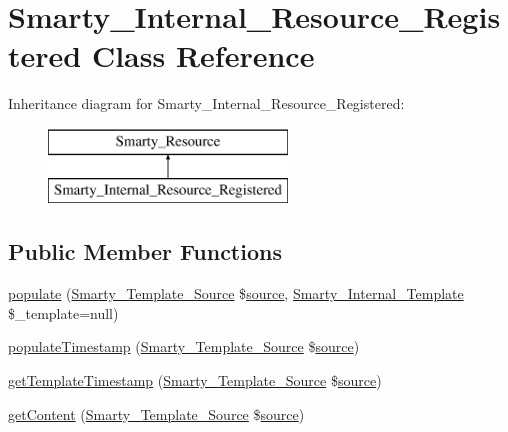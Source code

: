 \hypertarget{class_smarty___internal___resource___registered}{}\section{Smarty\+\_\+\+Internal\+\_\+\+Resource\+\_\+\+Registered Class Reference}
\label{class_smarty___internal___resource___registered}
Inheritance diagram for Smarty\+\_\+\+Internal\+\_\+\+Resource\+\_\+\+Registered\+:\begin{figure}[H]
\begin{center}
\leavevmode
\includegraphics[height=2.000000cm]{class_smarty___internal___resource___registered}
\end{center}
\end{figure}
\subsection*{Public Member Functions}
\begin{DoxyCompactItemize}
\item 
\hyperlink{class_smarty___internal___resource___registered_a07a771f460d625d63fcb72d0aeed0b01}{populate} (\hyperlink{class_smarty___template___source}{Smarty\+\_\+\+Template\+\_\+\+Source} \$\hyperlink{class_smarty___resource_ab6ac6b66dac2da6c41a178102f7d53e4}{source}, \hyperlink{class_smarty___internal___template}{Smarty\+\_\+\+Internal\+\_\+\+Template} \$\+\_\+template=null)
\item 
\hyperlink{class_smarty___internal___resource___registered_a0935298de0f84d80fdb2ec7c9c52a763}{populate\+Timestamp} (\hyperlink{class_smarty___template___source}{Smarty\+\_\+\+Template\+\_\+\+Source} \$\hyperlink{class_smarty___resource_ab6ac6b66dac2da6c41a178102f7d53e4}{source})
\item 
\hyperlink{class_smarty___internal___resource___registered_ae1dd02e9a08359a07ba3e5f0dcd0b846}{get\+Template\+Timestamp} (\hyperlink{class_smarty___template___source}{Smarty\+\_\+\+Template\+\_\+\+Source} \$\hyperlink{class_smarty___resource_ab6ac6b66dac2da6c41a178102f7d53e4}{source})
\item 
\hyperlink{class_smarty___internal___resource___registered_a0e40116a3d4f59cf7ea39f83441169b8}{get\+Content} (\hyperlink{class_smarty___template___source}{Smarty\+\_\+\+Template\+\_\+\+Source} \$\hyperlink{class_smarty___resource_ab6ac6b66dac2da6c41a178102f7d53e4}{source})
\end{DoxyCompactItemize}
